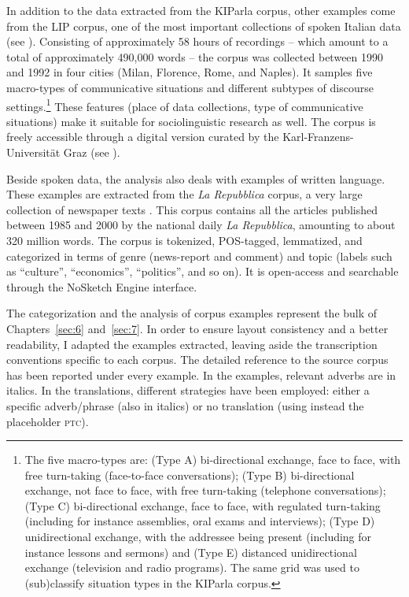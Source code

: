 In addition to the data extracted from the KIParla corpus, other examples come from the LIP corpus, one of the most important collections of spoken Italian data (see \citealt{MauroEtAl1993}). Consisting of approximately 58 hours of recordings – which amount to a total of approximately 490,000 words – the corpus was collected between 1990 and 1992 in four cities (Milan, Florence, Rome, and Naples). It samples five macro-types of communicative situations and different subtypes of discourse settings.\footnote{The five macro-types are: (Type A) bi-directional exchange, face to face, with free turn-taking (face-to-face conversations); (Type B) bi-directional exchange, not face to face, with free turn-taking (telephone conversations); (Type C) bi-directional exchange, face to face, with regulated turn-taking (including for instance assemblies, oral exams and interviews); (Type D) unidirectional exchange, with the addressee being present (including for instance lessons and sermons) and (Type E) distanced unidirectional exchange (television and radio programs). The same grid was used to (sub)classify situation types in the KIParla corpus.} These features (place of data collections, type of communicative situations) make it suitable for sociolinguistic research as well. The corpus is freely accessible through a digital version curated by the Karl-Franzens-Universität Graz (see \citealt{Schneider2002}).

Beside spoken data, the analysis also deals with examples of written language. These examples are extracted from the \textit{La Repubblica} corpus, a very large collection of newspaper texts \citep{BaroniEtAl2004}. This corpus contains all the articles published between 1985 and 2000 by the national daily \textit{La Repubblica}, amounting to about 320 million words. The corpus is tokenized, POS-tagged, lemmatized, and categorized in terms of genre (news-report and comment) and topic (labels such as “culture”, “economics”, “politics”, and so on). It is open-access and searchable through the NoSketch Engine interface.

The categorization and the analysis of corpus examples represent the bulk of Chapters~\ref{sec:6} and~\ref{sec:7}. In order to ensure layout consistency and a better readability, I adapted the examples extracted, leaving aside the transcription conventions specific to each corpus. The detailed reference to the source corpus has been reported under every example. In the examples, relevant adverbs are in italics. In the translations, different strategies have been employed: either a specific adverb/phrase (also in italics) or no translation (using instead the placeholder \textsc{ptc}).

